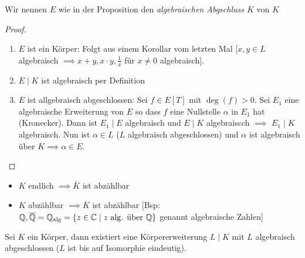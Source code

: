 \begin{definition}
	Wir nennen $E$ wie in der Proposition den \emph{algebraischen Abgschluss $\overline{K}$ } von $K$
\end{definition}

\begin{proof}
	\begin{enumerate}[(1)]
		\item $E$ ist ein Körper: Folgt aus einem Korollar vom letzten Mal [$x,y \in L$ algebraisch $\implies x+y,x\cdot y,\frac{1}{x}$ für $x \neq 0$ algebraisch].
		\item   $E \mid K$ ist algebraisch per Definition
		\item $E$ ist allgebraisch abgeschlossen: Sei $f \in E[T]$ mit $\deg(f) > 0$. Sei $E_1$ eine algebraische Erweiterung von $E$ so dass
			$f$ eine Nullstelle $\alpha$ in $E_1$ hat (Kronecker). Dann ist $E_1 \mid E$ algebraisch und $E \mid K$ algebraiscch $\implies$ $E_1 \mid K$ algebraisch.
			Nun ist $\alpha \in L$ ($L$ algebraisch abgeschlossen) und $\alpha$ ist algebraisch über $K \implies \alpha \in E$.
	\end{enumerate}
\end{proof}

\begin{remark}
	\begin{itemize}
		\item $K$ endlich $\implies \overline{K}$ ist abzählbar
		\item $K$ abzählbar $\implies \overline{K}$ ist abzählbar [Bsp: $\mathbb{Q}, \overline{\mathbb{Q}} = \mathbb{Q}_{\operatorname{alg}} = \{z \in \mathbb{C} \mid z \text{ alg. über } \mathbb{Q}\}$ genannt algebraische Zahlen]
	\end{itemize}
\end{remark}

\begin{theorem}
	Sei $K$ ein Körper, dann existiert eine Körpererweiterung $L \mid K$ mit $L$ algebraisch abgeschlossen ($L$ ist bis auf Isomorphie eindeutig).
\end{theorem}

